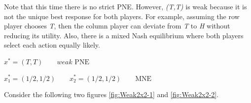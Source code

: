 Note that this time there is no strict PNE. However, \textit{(T,T)} is weak because it is not the unique best response for both players. For example, assuming the row player chooses \textit{T}, then the column player can deviate from \textit{T} to \textit{H} without reducing its utility. Also, there is a mixed Nash equilibrium where both players select each action equally likely. 

\begin{description}\centering
    \item $x^{*} = (T,T) \qquad \textit{weak }\text{PNE}$
    \item $x_{1}^* = (1/2,1/2) \qquad x_{2}^* = (1/2,1/2) \qquad \text{MNE}$
\end{description}

Consider the following two figures \ref{fig:Weak2x2-1} and \ref{fig:Weak2x2-2}. 

